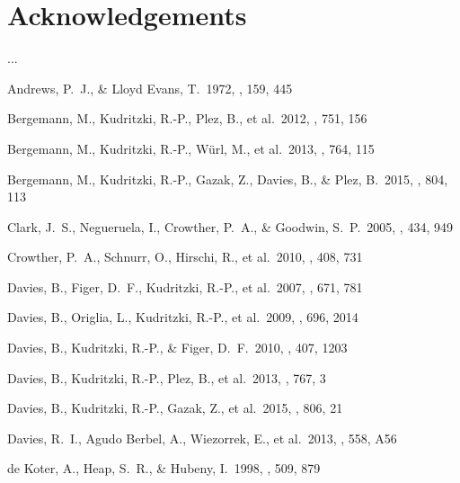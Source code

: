 \documentclass[useAMS,usenatbib]{mn2e}
\begin{document}
\section*{Acknowledgements}

...

% 

\begin{thebibliography}{99}

 Andrews, P.~J., \& Lloyd Evans, T.\ 1972, \mnras, 159, 445

 Bergemann, M.,
Kudritzki, R.-P., Plez, B., et al.\ 2012, \apj, 751, 156

 Bergemann, M.,
Kudritzki, R.-P., W{\"u}rl, M., et al.\ 2013, \apj, 764, 115

 Bergemann, M.,
Kudritzki, R.-P., Gazak, Z., Davies, B., \& Plez, B.\ 2015, \apj, 804, 113

 Clark, J.~S., Negueruela, I., Crowther, P.~A., \& Goodwin, S.~P.\ 2005, \aap, 434, 949

 Crowther, P.~A.,
Schnurr, O., Hirschi, R., et al.\ 2010, \mnras, 408, 731

 Davies, B., Figer,
D.~F., Kudritzki, R.-P., et al.\ 2007, \apj, 671, 781

 Davies, B., Origlia, L.,
Kudritzki, R.-P., et al.\ 2009, \apj, 696, 2014

 Davies, B., Kudritzki,
R.-P., \& Figer, D.~F.\ 2010, \mnras, 407, 1203

 Davies, B., Kudritzki,
R.-P., Plez, B., et al.\ 2013, \apj, 767, 3

 Davies, B., Kudritzki,
R.-P., Gazak, Z., et al.\ 2015, \apj, 806, 21

 Davies, R.~I., Agudo Berbel, A., Wiezorrek, E., et al.\ 2013, \aap, 558, A56

 de Koter, A., Heap,
S.~R., \& Hubeny, I.\ 1998, \apj, 509, 879


\end{thebibliography}
\end{document}
